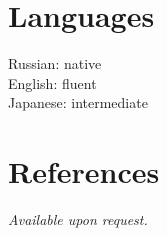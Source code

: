 \documentclass[margin,line]{CV}
\begin{document}
\begin{resume}
    \section{\mysidestyle Languages}
    Russian: native \\
    English: fluent \\
    Japanese: intermediate

    \section{\mysidestyle References}
    {\sl Available upon request.}

\end{resume}
\end{document}
